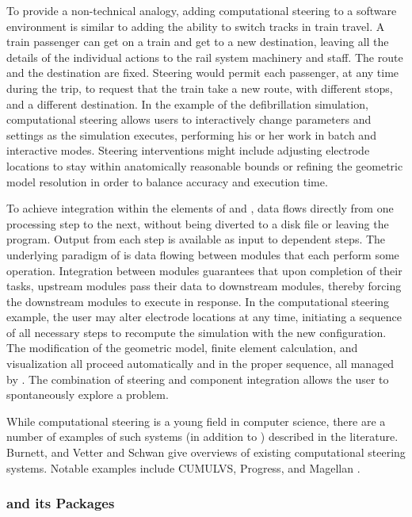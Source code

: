 To provide a non-technical analogy, adding computational steering to a
software environment is similar to adding the ability to 
switch tracks in train travel.  A train passenger can get on a train
and get to a new destination, leaving all the details of
the individual actions to the rail system machinery and staff. The route and the 
destination are fixed.  Steering would permit each
passenger, at any time during the trip,  to request that the train take a new route, with different
stops, and a different destination.  In the example
of the defibrillation simulation, computational steering allows users to interactively change parameters and settings as the
simulation executes, performing his or her work in batch and interactive
modes.  Steering interventions might include adjusting electrode
locations to stay within anatomically reasonable bounds or refining
the geometric model resolution in order to balance accuracy and
execution time.

To achieve integration within the elements of \SR{} and \BIOPSE{},
data flows directly from one processing step to the next, without
being diverted to a disk file or leaving the program.  Output from
each step is available as input to dependent steps.  The underlying
paradigm of \SR{} is data flowing between modules that each perform
some operation.  Integration between modules guarantees that upon
completion of their tasks, upstream modules pass their data to
downstream modules, thereby forcing the downstream modules to execute
in response.  In the computational steering example,  the user may alter
electrode locations at any time, initiating a sequence of all
necessary steps to recompute the simulation with the new
configuration.  The modification of the geometric model, finite
element calculation, and visualization all proceed automatically and
in the proper sequence, all managed by \SR{}.  The combination of
steering and component integration allows the user to
spontaneously explore a problem.

While computational steering is a young field in computer
science, there are a number of examples of such systems (in addition
to \SR{}) described in the literature.  Burnett\cite{MM:Bur94}, and
Vetter and Schwan\cite{MM:Vet96} give overviews of existing
computational steering systems. Notable examples include
CUMULVS\cite{MM:Gei96,MM:Koh97}, 
Progress\cite{MM:Vet95},  and Magellan\cite{MM:Vet97a}
.



\subsubsection{\SR{} and its Packages}
\label{sec:srversuspse}

